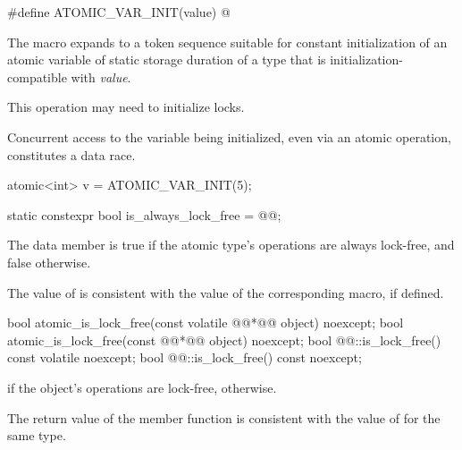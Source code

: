 \begin{itemdecl}
#define ATOMIC_VAR_INIT(value) @\seebelow@
\end{itemdecl}

\begin{itemdescr}
\pnum
The macro expands to a token sequence suitable for
constant initialization of
an atomic variable of static storage duration of a type that is
initialization-compatible with \textit{value}.
\begin{note} This operation may need to initialize locks. \end{note}
Concurrent access to the variable being initialized, even via an atomic operation,
constitutes a data race. \begin{example}
\begin{codeblock}
atomic<int> v = ATOMIC_VAR_INIT(5);
\end{codeblock}
\end{example}
\end{itemdescr}

%
\begin{itemdecl}
static constexpr bool is_always_lock_free = @\impdef{}@;
\end{itemdecl}

\begin{itemdescr}
\pnum
The  data member  is true
if the atomic type's operations are always lock-free, and false otherwise.
\begin{note}
The value of  is consistent with the value of
the corresponding  macro, if defined.
\end{note}
\end{itemdescr}

%
%
\begin{itemdecl}
bool atomic_is_lock_free(const volatile @@*@\itcorr[-1]@ object) noexcept;
bool atomic_is_lock_free(const @@*@\itcorr[-1]@ object) noexcept;
bool @@::is_lock_free() const volatile noexcept;
bool @@::is_lock_free() const noexcept;
\end{itemdecl}

\begin{itemdescr}
\pnum
\returns {} if the object's operations are lock-free,  otherwise.
\begin{note}
The return value of the  member function
is consistent with the value of  for the same type.
\end{note}
\end{itemdescr}

